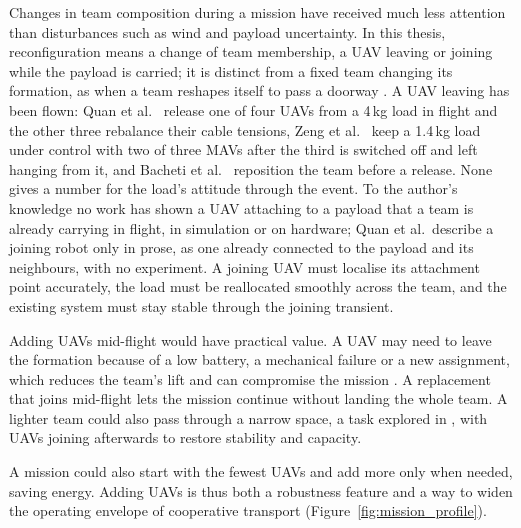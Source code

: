 Changes in team composition during a mission have received much less attention than disturbances such as wind and payload uncertainty. In this thesis, reconfiguration means a change of team membership, a UAV leaving or joining while the payload is carried; it is distinct from a fixed team changing its formation, as when a team reshapes itself to pass a doorway \cite{jackson2020scalable}. A UAV leaving has been flown: Quan et al.\ \cite{quan2025swarm} release one of four UAVs from a 4\,kg load in flight and the other three rebalance their cable tensions, Zeng et al.\ \cite{zeng2025marl} keep a 1.4\,kg load under control with two of three MAVs after the third is switched off and left hanging from it, and Bacheti et al.\ \cite{tensionbased} reposition the team before a release. None gives a number for the load's attitude through the event. To the author's knowledge no work has shown a UAV attaching to a payload that a team is already carrying in flight, in simulation or on hardware; Quan et al.\ describe a joining robot only in prose, as one already connected to the payload and its neighbours, with no experiment. A joining UAV must localise its attachment point accurately, the load must be reallocated smoothly across the team, and the existing system must stay stable through the joining transient.

Adding UAVs mid-flight would have practical value. A UAV may need to leave the formation because of a low battery, a mechanical failure or a new assignment, which reduces the team's lift and can compromise the mission \cite{farrasFaultTolerantControlMultiQuadcopter2024}. A replacement that joins mid-flight lets the mission continue without landing the whole team. A lighter team could also pass through a narrow space, a task explored in \cite{tudelft, tensionbased}, with UAVs joining afterwards to restore stability and capacity.

A mission could also start with the fewest UAVs and add more only when needed, saving energy. Adding UAVs is thus both a robustness feature and a way to widen the operating envelope of cooperative transport (Figure~\ref{fig:mission_profile}).


